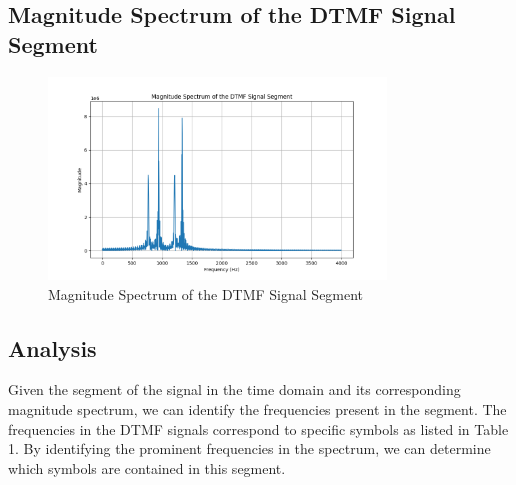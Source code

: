 \subsection*{Magnitude Spectrum of the DTMF Signal Segment}
\begin{figure}[h]
    \centering
    \includegraphics[width=0.8\textwidth]{fig/ex4_a_dtmf_spectrum.png}
    \caption{Magnitude Spectrum of the DTMF Signal Segment}
    \label{fig:ex4_a_dtmf_spectrum}
\end{figure}

\subsection*{Analysis}
Given the segment of the signal in the time domain and its corresponding magnitude spectrum, we can identify the frequencies present in the segment. The frequencies in the DTMF signals correspond to specific symbols as listed in Table 1. By identifying the prominent frequencies in the spectrum, we can determine which symbols are contained in this segment.
